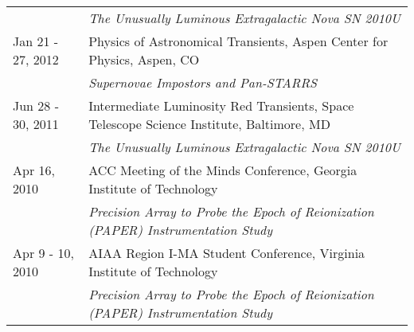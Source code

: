 \begin{longtable}{@{\hspace{10pt}}p{1.2in}l}
  & \emph{The Unusually Luminous Extragalactic Nova SN 2010U}\\
  Jan 21 - 27, 2012 & Physics of Astronomical Transients, Aspen Center for Physics, Aspen, CO \\
  & \emph{Supernovae Impostors and Pan-STARRS} \\[\rowskip]
  Jun 28 - 30, 2011 & Intermediate Luminosity Red Transients, Space Telescope Science Institute, Baltimore, MD\\
  & \emph{The Unusually Luminous Extragalactic Nova SN 2010U} \\[\rowskip]
  Apr 16, 2010 & ACC Meeting of the Minds Conference, Georgia Institute of Technology \\
  & \emph{Precision Array to Probe the Epoch of Reionization (PAPER) Instrumentation Study} \\[\rowskip]
  Apr 9 - 10, 2010 &  AIAA Region I-MA Student Conference, Virginia Institute of Technology\\
  & \emph{Precision Array to Probe the Epoch of Reionization (PAPER) Instrumentation Study} \\[\rowskip]
\end{longtable}
